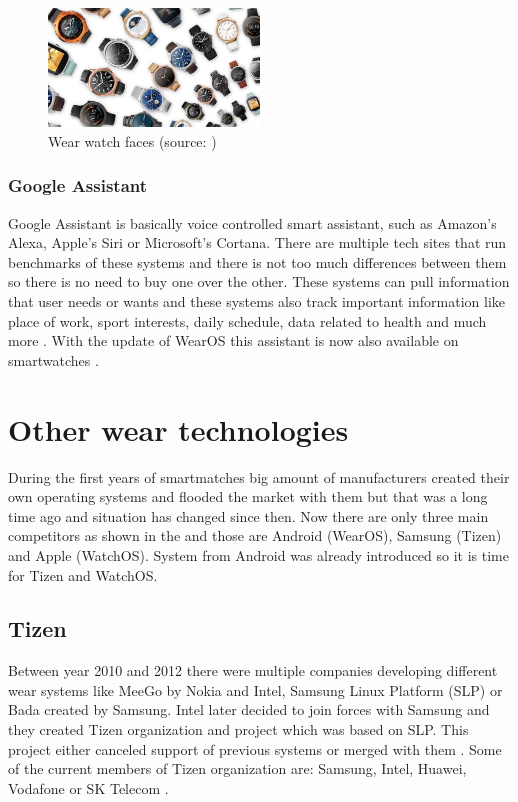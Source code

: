 \begin{figure}[H]
	\begin{centering}
		\includegraphics[width=0.5\textwidth]{img/wear_watch_faces}
		\par\end{centering}
	\caption{Wear watch faces (source: \cite{AW2UG})\label{fig:WearWatchFaces}}
	\label{fig04c04}
\end{figure}

\subsubsection{Google Assistant}\label{sec:GoogleAssistant}
Google Assistant is basically voice controlled smart assistant, such as Amazon's Alexa, Apple's Siri or Microsoft's Cortana. There are multiple tech sites that run benchmarks of these systems \cite{ASGA, VACCGASAB, CAGACS, GASBAC} and there is not too much differences between them so there is no need to buy one over the other. These systems can pull information that user needs or wants and these systems also track important information like place of work, sport interests, daily schedule, data related to health and much more \cite{WIGA}. With the update of WearOS this assistant is now also available on smartwatches \cite{AW2UG, AW2WN}.

\section{Other wear technologies}\label{sec:OtherWearTechnologies}
During the first years of smartmatches big amount of manufacturers created their own operating systems and flooded the market with them but that was a long time ago and situation has changed since then. Now there are only three main competitors as shown in the  and those are Android (WearOS), Samsung (Tizen) and Apple (WatchOS). System from Android was already introduced so it is time for Tizen and WatchOS.

\subsection{Tizen}\label{sec:Tizen}
Between year 2010 and 2012 there were multiple companies developing different wear systems like MeeGo by Nokia and Intel, Samsung Linux Platform (SLP) or Bada created by Samsung. Intel later decided to join forces with Samsung and they created Tizen organization and project which was based on SLP. This project either canceled support of previous systems or merged with them \cite{TOSBHR}. Some of the current members of Tizen organization are: Samsung, Intel, Huawei, Vodafone or SK Telecom \cite{TizenM}.

